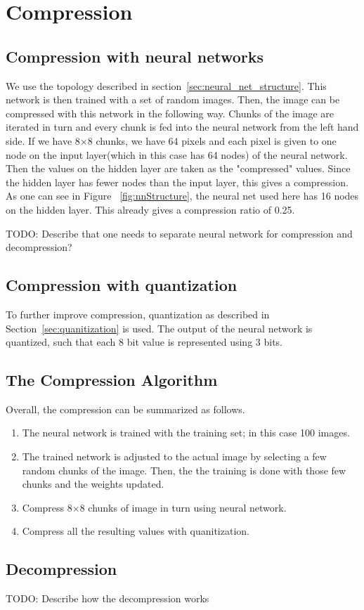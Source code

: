 \section{Compression}

\subsection{Compression with neural networks}
We use the topology described in section~\ref{sec:neural_net_structure}. This network is then trained with a set of random images. Then, the image can be compressed with this network in the following way. Chunks of the image are iterated in turn and every chunk is fed into the neural network from the left hand side. If we have 8$\times$8 chunks, we have 64 pixels and each pixel is given to one node on the input layer(which in this case has 64 nodes) of the neural network. Then the values on the hidden layer are taken as the "compressed" values. Since the hidden layer has fewer nodes than the input layer, this gives a compression. As one can see in Figure ~\ref{fig:nnStructure}, the neural net used here has 16 nodes on the hidden layer. This already gives a compression ratio of 0.25. 

TODO: Describe that one needs to separate neural network for compression and decompression?

\subsection{Compression with quantization}
To further improve compression, quantization as described in Section~\ref{sec:quanitization} is used. The output of the neural network is quantized, such that each 8 bit value is represented using 3 bits.  

\subsection{The Compression Algorithm}
\label{sec:compAlg}

Overall, the compression can be summarized as follows.

\begin{enumerate}
\item The neural network is trained with the training set; in this case 100 images.
\item The trained network is adjusted to the actual image by selecting a few random chunks of the image. Then, the the training is done with those few chunks and the weights updated. 
\item Compress 8$\times$8 chunks of image in turn using neural network.
\item Compress all the resulting values with quanitization.

\end{enumerate}

\subsection{Decompression}
\label{sec:decompAlg}
TODO: Describe how the decompression works